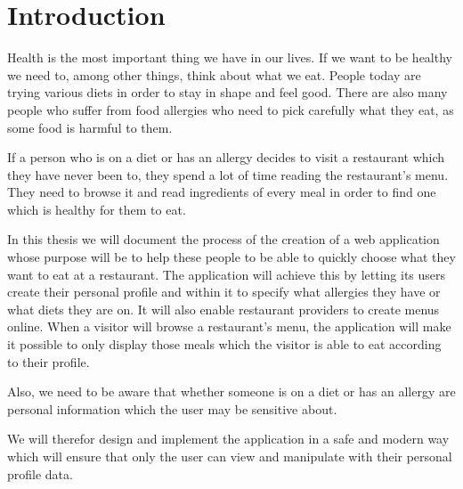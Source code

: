 \chapter*{Introduction}

Health is the most important thing we have in our lives.
If we want to be healthy we need to, among other things, think about what we eat.
People today are trying various diets in order to stay in shape and feel good.
There are also many people who suffer from food allergies who need to pick carefully what they eat, as some food is harmful to them. 

If a person who is on a diet or has an allergy decides to visit a restaurant which they have never been to, they spend a lot of time reading the restaurant's menu. 
They need to browse it and read ingredients of every meal in order to find one which is healthy for them to eat.

In this thesis we will document the process of the creation of a web application whose purpose will be to help these people to be able to quickly choose what they want to eat at a restaurant. 
The application will achieve this by letting its users create their personal profile and within it to specify what allergies they have or what diets they are on. 
It will also enable restaurant providers to create menus online. 
When a visitor will browse a restaurant's menu, the application will make it possible to only display those meals which the visitor is able to eat according to their profile.

Also, we need to be aware that whether someone is on a diet or has an allergy are personal information which the user may be sensitive about.

We will therefor design and implement the application in a safe and modern way which will ensure that only the user can view and manipulate with their personal profile data.
